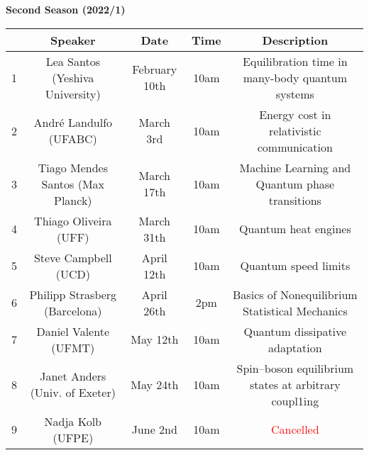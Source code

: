 \documentclass[a4paper,preprintnumbers,floatfix,superscriptaddress,pra,onecolumn,showpacs,notitlepage,longbibliography]{revtex4-1}
\begin{document}
\vspace{1cm}
\textbf{Second Season (2022/1)}
\begin{center}
 \begin{tabular}{| c | c | c | c | c |} 
 \hline
 & Speaker & Date & Time & Description \\ [0.5ex] 
 \hline\hline
1 & Lea Santos (Yeshiva University) & February 10th & 10am & Equilibration time in many-body quantum systems \\ 
 \hline
2 & André Landulfo (UFABC) & March 3rd & 10am & Energy cost in relativistic communication \\
 \hline
3 & Tiago Mendes Santos (Max Planck) & March 17th & 10am & Machine Learning and Quantum phase transitions \\
 \hline
4 & Thiago Oliveira (UFF) & March 31th & 10am & Quantum heat engines
 \\  
 \hline
5 & Steve Campbell (UCD) & April 12th & 10am & Quantum speed limits \\  
 \hline
6 & Philipp Strasberg (Barcelona) & April 26th & 2pm & Basics of Nonequilibrium Statistical Mechanics \\ 
 \hline
7 & Daniel Valente (UFMT) & May 12th & 10am & Quantum dissipative adaptation \\ 
 \hline

8 & Janet Anders (Univ. of Exeter) & May 24th & 10am & Spin–boson equilibrium states at arbitrary coupl1ing \\
 \hline
 
9 & Nadja Kolb (UFPE) & June 2nd & 10am & \textcolor{red}{Cancelled} \\
\hline
 
\end{tabular}
\end{center}


\end{document}
